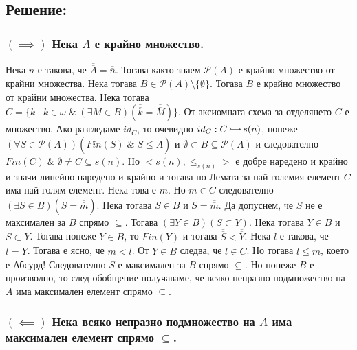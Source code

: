 \documentclass[12pt]{article}
\newcommand{\injection}[0]{\,\mathlarger{\mathlarger{\rightarrowtail}}\,}
\begin{document}
\subsection*{Решение:}

\subsubsection*{\((\implies)\) Нека \(A\) е крайно множество.}
Нека \(n\) е такова, че \(\overline{\overline{A}} = \overline{\overline{n}}\).
Тогава както знаем \(\mathcal{P}(A)\) е крайно множество от крайни множества.
Нека тогава \(B \in \mathcal{P}(A) \setminus \{\emptyset\}\).
Тогава \(B\) е крайно множество от крайни множества.
Нека тогава \\
\(C = \{k \; | \; k \in \omega \; \& \; (\exists M \in B)(\overline{\overline{k}} = \overline{\overline{M}})\}\).
От аксиомната схема за отделянето \(C\) е множество.
Ако разгледаме \(id_C\), то очевидно \(id_C : C \injection s(n)\),
понеже \((\forall S \in \mathcal{P}(A))(Fin(S) \; \& \; \overline{\overline{S}} \leq \overline{\overline{A}})\) и \(\emptyset \subset B \subseteq \mathcal{P}(A)\) и следователно \\ \(Fin(C) \; \& \; \emptyset \neq C \subseteq s(n)\). Но \(<s(n), \leq_{s(n)}>\) е добре наредено и крайно и значи линейно наредено и крайно и тогава по Лемата за най-големия елемент \(C\) има най-голям елемент. Нека това е \(m\). 
Но \(m \in C\) следователно \((\exists S \in B)(\overline{\overline{S}} = \overline{\overline{m}})\). Нека тогава \(S \in B\) и \(\overline{\overline{S}} = \overline{\overline{m}}\). Да допуснем, че \(S\) не е максимален за \(B\) спрямо \(\subseteq\). Тогава \((\exists Y \in B)(S \subset Y)\).
Нека тогава \(Y \in B\) и \(S \subset Y\).
Тогава понеже \(Y \in B\), то \(Fin(Y)\) и тогава \(\overline{\overline{S}} < \overline{\overline{Y}}\). Нека \(l\) е такова, че \(\overline{\overline{l}} = \overline{\overline{Y}}\). Тогава е ясно, че \(m < l\).
От \(Y \in B\) следва, че \(l \in C\). Но тогава \(l \leq m\), което е Абсурд!
Следователно \(S\) е максимален за \(B\) спрямо \(\subseteq\).
Но понеже \(B\) е произволно, то след обобщение получаваме,
че всяко непразно подмножество на \(A\) има максимален елемент спрямо \(\subseteq\).

\subsubsection*{\((\impliedby)\) Нека всяко непразно подмножество на \(A\) има максимален елемент спрямо \(\subseteq\).}
\end{document}
